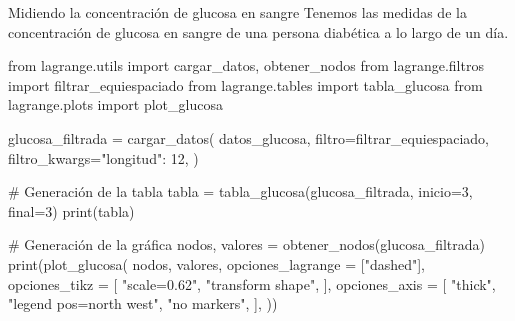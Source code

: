 \begin{frame}[fragile]{Midiendo la concentración de glucosa en sangre}
  Tenemos las medidas de la concentración de glucosa en sangre de una
  persona diabética a lo largo de un día.
  
  \begin{multicols}{2}
    \begin{pycode}[glucosa]
      from lagrange.utils import cargar_datos, obtener_nodos
      from lagrange.filtros import filtrar_equiespaciado
      from lagrange.tables import tabla_glucosa
      from lagrange.plots import plot_glucosa

      glucosa_filtrada = cargar_datos(
        datos_glucosa,
        filtro=filtrar_equiespaciado,
        filtro_kwargs={"longitud": 12},
      )
    \end{pycode}

    \begin{pycode}[glucosa]
      # Generación de la tabla
      tabla = tabla_glucosa(glucosa_filtrada, inicio=3, final=3)
      print(tabla)
    \end{pycode}

    \columnbreak

    \begin{pycode}[glucosa]
      # Generación de la gráfica
      nodos, valores = obtener_nodos(glucosa_filtrada)
      print(plot_glucosa(
        nodos,
        valores,
        opciones_lagrange = ["dashed"],
        opciones_tikz = [
          "scale=0.62",
          "transform shape",
        ],
        opciones_axis = [
          "thick",
          "legend pos=north west",
          "no markers",
        ],
      ))
    \end{pycode}
  \end{multicols}
\end{frame}
